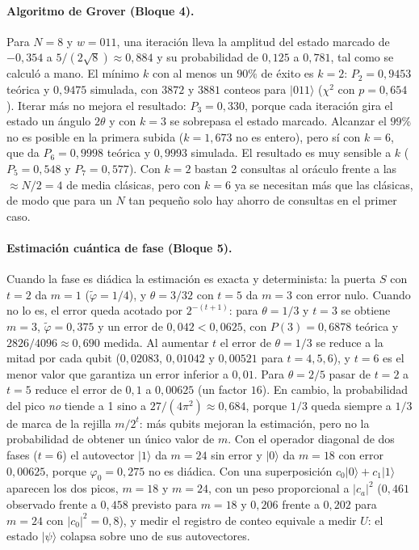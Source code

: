 \paragraph{Algoritmo de Grover (Bloque 4).} Para $N=8$ y $w=011$, una iteración lleva la amplitud del estado marcado de $-0{,}354$ a $5/(2\sqrt8)\approx0{,}884$ y su probabilidad de $0{,}125$ a $0{,}781$, tal como se calculó a mano.
El mínimo $k$ con al menos un $90\%$ de éxito es $k=2$: $P_2=0{,}9453$ teórica y $0{,}9475$ simulada, con $3872$ y $3881$ conteos para $|011\rangle$ ($\chi^2$ con $p=0{,}654$). Iterar más no mejora el resultado:
$P_3=0{,}330$, porque cada iteración gira el estado un ángulo $2\theta$ y con $k=3$ se sobrepasa el estado marcado. Alcanzar el $99\%$ no es posible en la primera subida ($k=1{,}673$ no es entero),
pero sí con $k=6$, que da $P_6=0{,}9998$ teórica y $0{,}9993$ simulada. El resultado es muy sensible a $k$ ($P_5=0{,}548$ y $P_7=0{,}577$). Con $k=2$ bastan 2 consultas al oráculo frente a las $\approx N/2=4$ de media clásicas,
pero con $k=6$ ya se necesitan más que las clásicas, de modo que para un $N$ tan pequeño solo hay ahorro de consultas en el primer caso.

\paragraph{Estimación cuántica de fase (Bloque 5).} Cuando la fase es diádica la estimación es exacta y determinista: la puerta $S$ con $t=2$ da $m=1$ ($\tilde\varphi=1/4$), y $\theta=3/32$ con $t=5$ da $m=3$ con error nulo.
Cuando no lo es, el error queda acotado por $2^{-(t+1)}$: para $\theta=1/3$ y $t=3$ se obtiene $m=3$, $\tilde\varphi=0{,}375$ y un error de $0{,}042<0{,}0625$, con $P(3)=0{,}6878$ teórica y $2826/4096\approx0{,}690$ medida.
Al aumentar $t$ el error de $\theta=1/3$ se reduce a la mitad por cada qubit ($0{,}02083$, $0{,}01042$ y $0{,}00521$ para $t=4,5,6$), y $t=6$ es el menor valor que garantiza un error inferior a $0{,}01$.
Para $\theta=2/5$ pasar de $t=2$ a $t=5$ reduce el error de $0{,}1$ a $0{,}00625$ (un factor $16$). En cambio, la probabilidad del pico \emph{no} tiende a 1 sino a $27/(4\pi^2)\approx0{,}684$, porque
$1/3$ queda siempre a $1/3$ de marca de la rejilla $m/2^t$: más qubits mejoran la estimación, pero no la probabilidad de obtener un único valor de $m$. Con el operador diagonal de dos fases ($t=6$)
el autovector $|1\rangle$ da $m=24$ sin error y $|0\rangle$ da $m=18$ con error $0{,}00625$, porque $\varphi_0=0{,}275$ no es diádica. Con una superposición $c_0|0\rangle+c_1|1\rangle$ aparecen los dos picos, $m=18$ y $m=24$,
con un peso proporcional a $|c_a|^2$ ($0{,}461$ observado frente a $0{,}458$ previsto para $m=18$ y $0{,}206$ frente a $0{,}202$ para $m=24$ con $|c_0|^2=0{,}8$), y medir el registro de conteo equivale a medir $U$:
el estado $|\psi\rangle$ colapsa sobre uno de sus autovectores.

